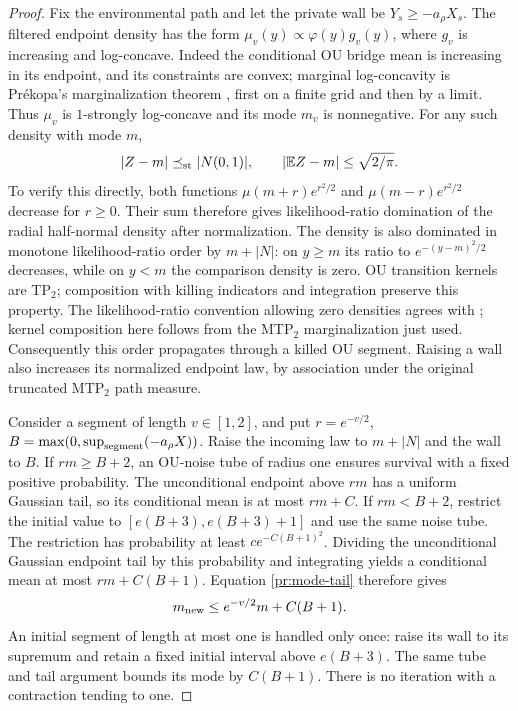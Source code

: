 \begin{proof}
Fix the environmental path and let the private wall be
$Y_s\ge-a_\rho X_s$. The filtered endpoint density has the form
$\mu_v(y)\propto\varphi(y)g_v(y)$, where $g_v$ is increasing and
log-concave. Indeed the conditional OU bridge mean is increasing in its
endpoint, and its constraints are convex; marginal log-concavity is
Pr\'ekopa's marginalization theorem
\cite[Theorem~6, p.~342]{Prekopa1973}, first on a finite grid and then by
a limit.
Thus $\mu_v$ is $1$-strongly log-concave and its mode $m_v$ is nonnegative.
For any such density with mode $m$,
\begin{equation}
 |Z-m|\preceq_{\rm st}|N(0,1)|,
 \qquad |\mathbb E Z-m|\le\sqrt{2/\pi}.                     \label{pr:mode-tail}
\end{equation}
To verify this directly, both functions
$\mu(m+r)e^{r^2/2}$ and $\mu(m-r)e^{r^2/2}$ decrease for $r\ge0$.
Their sum therefore gives likelihood-ratio domination of the radial
half-normal density after normalization.
The density is also dominated in monotone likelihood-ratio order by
$m+|N|$: on $y\ge m$ its ratio to $e^{-(y-m)^2/2}$ decreases, while
on $y<m$ the comparison density is zero. OU transition kernels are TP$_2$;
composition with killing indicators and integration preserve this property.
The likelihood-ratio convention allowing zero densities agrees with
\cite[Theorem~1 and Remark~16]{DuembgenMoesching2023}; kernel composition
here follows from the MTP$_2$ marginalization just used. Consequently
this order propagates through a killed OU segment.
Raising a wall also increases its normalized endpoint law, by association
under the original truncated MTP$_2$ path measure.

Consider a segment of length $v\in[1,2]$, and put $r=e^{-v/2}$,
$B=\max(0,\sup_{\rm segment}(-a_\rho X))$. Raise the incoming law to
$m+|N|$ and the wall to $B$. If $rm\ge B+2$, an OU-noise tube of radius
one ensures survival with a fixed positive probability. The unconditional
endpoint above $rm$ has a uniform Gaussian tail, so its conditional mean
is at most $rm+C$. If $rm<B+2$, restrict the initial value to
$[e(B+3),e(B+3)+1]$ and use the same noise tube. The restriction has
probability at least $c e^{-C(B+1)^2}$. Dividing the unconditional
Gaussian endpoint tail by this probability and integrating yields a
conditional mean at most $rm+C(B+1)$. Equation \eqref{pr:mode-tail}
therefore gives
\begin{equation}
 m_{\rm new}\le e^{-v/2}m+C(B+1).                            \label{pr:mode-recursion}
\end{equation}
An initial segment of length at most one is handled only once: raise its
wall to its supremum and retain a fixed initial interval above
$e(B+3)$. The same tube and tail argument bounds its mode by $C(B+1)$.
There is no iteration with a contraction tending to one.


\end{proof}
